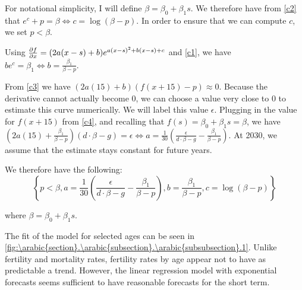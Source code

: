 \documentclass[10pt]{article}
\renewcommand{\thesection}{\arabic{section}}
\renewcommand{\thesubsection}{\thesection.\arabic{subsection}}
\renewcommand{\thesubsubsection}{\thesubsection.\arabic{subsubsection}}
\numberwithin{equation}{subsection}
\begin{document}
\par For notational simplicity, I will define \(\beta = \beta_0 + \beta_1s\). We therefore have from \ref{c2} that \(e^c + p = \beta \Leftrightarrow c = \log(\beta - p)\). In order to ensure that we can compute \(c\), we set \(p < \beta\).

\par Using \(\pdv{f}{x} = (2a(x-s) + b)e^{a(x-s)^2 + b(x-s) + c}\) and \ref{c1}, we have \(be^c = \beta_1 \Leftrightarrow b = \frac{\beta_1}{\beta - p}\).

\par From \ref{c3} we have \((2a(15) + b)(f(x+15) - p) \approx 0\). Because the derivative cannot actually become 0, we can choose a value very close to 0 to estimate this curve numerically. We will label this value \(\epsilon\). Plugging in the value for \(f(x+15)\) from \ref{c4}, and recalling that \(f(s) = \beta_0 + \beta_1s = \beta\), we have \(\left(2a(15) + \frac{\beta_1}{\beta - p}\right)(d\cdot \beta - g) = \epsilon \Leftrightarrow a = \frac{1}{30}\left(\frac{\epsilon}{d\cdot\beta-g} - \frac{\beta_1}{\beta - p}\right)\). At 2030, we assume that the estimate stays constant for future years.

\par We therefore have the following:
\[
   \left\{
      p < \beta,
      a = \frac{1}{30}\left(\frac{\epsilon}{d\cdot\beta - g} - \frac{\beta_1}{\beta - p}\right),
      b = \frac{\beta_1}{\beta - p},
      c = \log(\beta - p)
   \right\}
\]

\par where \(\beta = \beta_0 + \beta_1s\).

\par The fit of the model for selected ages can be seen in \autoref{fig:\thesubsubsection.1}. Unlike fertility and mortality rates, fertility rates by age appear not to have as predictable a trend. However, the linear regression model with exponential forecasts seems sufficient to have reasonable forecasts for the short term.
\end{document}
